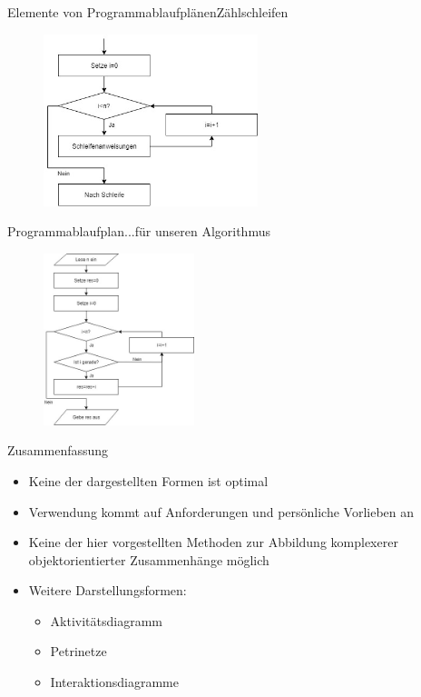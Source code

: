 \begin{frame}{Elemente von Programmablaufplänen}{Zählschleifen}
\begin{figure}
    \includegraphics[height=5cm]{graph/pap_forloop}
\end{figure}
\end{frame}

\begin{frame}{Programmablaufplan}{...für unseren Algorithmus}
\begin{onlyenv}
\begin{figure}
    \includegraphics[height=5cm]{graph/pap_sumeven}
\end{figure}
\end{onlyenv}
\end{frame}

\begin{frame}{Zusammenfassung}
    \begin{itemize}[<+->]
        \item Keine der dargestellten Formen ist optimal
        \item Verwendung kommt auf Anforderungen und persönliche Vorlieben an
        \item Keine der hier vorgestellten Methoden zur Abbildung komplexerer objektorientierter Zusammenhänge möglich
        \item Weitere Darstellungsformen:
        \begin{itemize}
            \item Aktivitätsdiagramm
            \item Petrinetze
            \item Interaktionsdiagramme
        \end{itemize}
    \end{itemize}
\end{frame}
